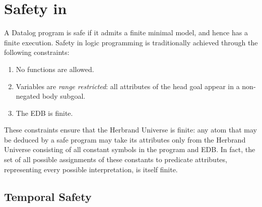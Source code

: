 \section{Safety in \large \bf \slang}

A Datalog program is safe if it admits a finite minimal model, and hence has
a finite execution.  Safety in logic programming is traditionally achieved
through the following constraints:

\begin{enumerate}
%
\item No functions are allowed.
%
\item Variables are \emph{range restricted}: all attributes of the head goal
appear in a non-negated body subgoal.
%
\item The EDB is finite.
%
\end{enumerate}

These constraints ensure that the Herbrand Universe is finite: any atom that
may be deduced by a safe program may take its attributes only from the Herbrand
Universe consisting of all constant symbols in the program and EDB.
In fact, the set of all possible assignments of these constants to predicate
attributes, representing every possible interpretation, is itself finite. 


  

\subsection{Temporal Safety}

